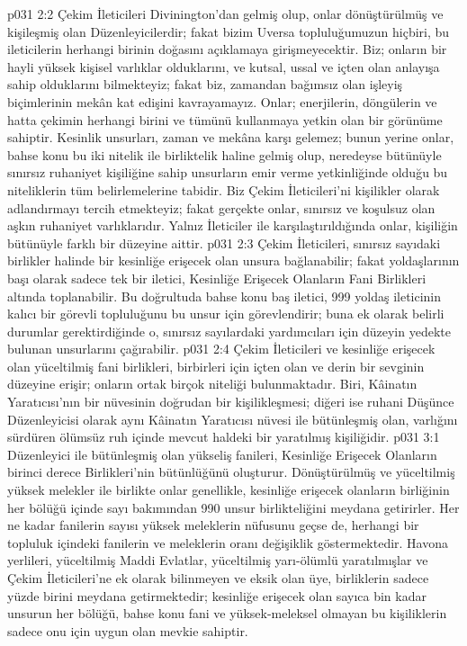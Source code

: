 \vs p031 2:2 Çekim İleticileri Divinington’dan gelmiş olup, onlar dönüştürülmüş ve kişileşmiş olan Düzenleyicilerdir; fakat bizim Uversa topluluğumuzun hiçbiri, bu ileticilerin herhangi birinin doğasını açıklamaya girişmeyecektir. Biz; onların bir hayli yüksek kişisel varlıklar olduklarını, ve kutsal, ussal ve içten olan anlayışa sahip olduklarını bilmekteyiz; fakat biz, zamandan bağımsız olan işleyiş biçimlerinin mekân kat edişini kavrayamayız. Onlar; enerjilerin, döngülerin ve hatta çekimin herhangi birini ve tümünü kullanmaya yetkin olan bir görünüme sahiptir. Kesinlik unsurları, zaman ve mekâna karşı gelemez; bunun yerine onlar, bahse konu bu iki nitelik ile birliktelik haline gelmiş olup, neredeyse bütünüyle sınırsız ruhaniyet kişiliğine sahip unsurların emir verme yetkinliğinde olduğu bu niteliklerin tüm belirlemelerine tabidir. Biz Çekim İleticileri’ni kişilikler olarak adlandırmayı tercih etmekteyiz; fakat gerçekte onlar, sınırsız ve koşulsuz olan aşkın ruhaniyet varlıklarıdır. Yalnız İleticiler ile karşılaştırıldığında onlar, kişiliğin bütünüyle farklı bir düzeyine aittir.
\vs p031 2:3 Çekim İleticileri, sınırsız sayıdaki birlikler halinde bir kesinliğe erişecek olan unsura bağlanabilir; fakat yoldaşlarının başı olarak sadece tek bir iletici, Kesinliğe Erişecek Olanların Fani Birlikleri altında toplanabilir. Bu doğrultuda bahse konu baş iletici, 999 yoldaş ileticinin kalıcı bir görevli topluluğunu bu unsur için görevlendirir; buna ek olarak belirli durumlar gerektirdiğinde o, sınırsız sayılardaki yardımcıları için düzeyin yedekte bulunan unsurlarını çağırabilir.
\vs p031 2:4 Çekim İleticileri ve kesinliğe erişecek olan yüceltilmiş fani birlikleri, birbirleri için içten olan ve derin bir sevginin düzeyine erişir; onların ortak birçok niteliği bulunmaktadır. Biri, Kâinatın Yaratıcısı’nın bir nüvesinin doğrudan bir kişilikleşmesi; diğeri ise ruhani Düşünce Düzenleyicisi olarak aynı Kâinatın Yaratıcısı nüvesi ile bütünleşmiş olan, varlığını sürdüren ölümsüz ruh içinde mevcut haldeki bir yaratılmış kişiliğidir.
\vs p031 3:1 Düzenleyici ile bütünleşmiş olan yükseliş fanileri, Kesinliğe Erişecek Olanların birinci derece Birlikleri’nin bütünlüğünü oluşturur. Dönüştürülmüş ve yüceltilmiş yüksek melekler ile birlikte onlar genellikle, kesinliğe erişecek olanların birliğinin her bölüğü içinde sayı bakımından 990 unsur birlikteliğini meydana getirirler. Her ne kadar fanilerin sayısı yüksek meleklerin nüfusunu geçse de, herhangi bir topluluk içindeki fanilerin ve meleklerin oranı değişiklik göstermektedir. Havona yerlileri, yüceltilmiş Maddi Evlatlar, yüceltilmiş yarı\hyp{}ölümlü yaratılmışlar ve Çekim İleticileri’ne ek olarak bilinmeyen ve eksik olan üye, birliklerin sadece yüzde birini meydana getirmektedir; kesinliğe erişecek olan sayıca bin kadar unsurun her bölüğü, bahse konu fani ve yüksek\hyp{}meleksel olmayan bu kişiliklerin sadece onu için uygun olan mevkie sahiptir.
